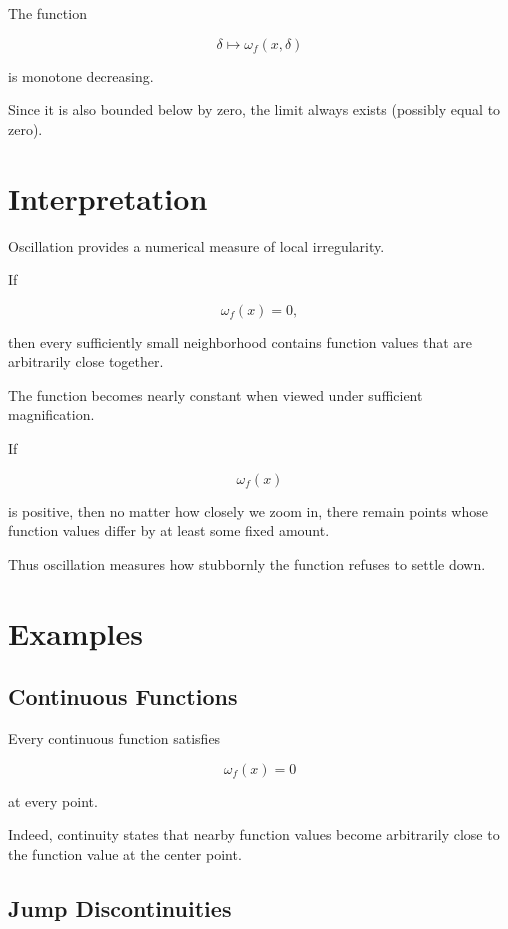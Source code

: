 \documentclass{essay}
\begin{document}
The function

\[
\delta
\longmapsto
\omega_f(x,\delta)
\]

is monotone decreasing.

Since it is also bounded below by zero, the limit always exists (possibly equal
to zero).


\section{Interpretation}

Oscillation provides a numerical measure of local irregularity.

If

\[
\omega_f(x)=0,
\]

then every sufficiently small neighborhood contains function values that are
arbitrarily close together.

The function becomes nearly constant when viewed under sufficient magnification.

If

\[
\omega_f(x)
\]

is positive, then no matter how closely we zoom in, there remain points whose
function values differ by at least some fixed amount.

Thus oscillation measures how stubbornly the function refuses to settle down.


\section{Examples}

\subsection{Continuous Functions}

Every continuous function satisfies

\[
\omega_f(x)=0
\]

at every point.

Indeed, continuity states that nearby function values become arbitrarily close
to the function value at the center point.


\subsection{Jump Discontinuities}
\end{document}

